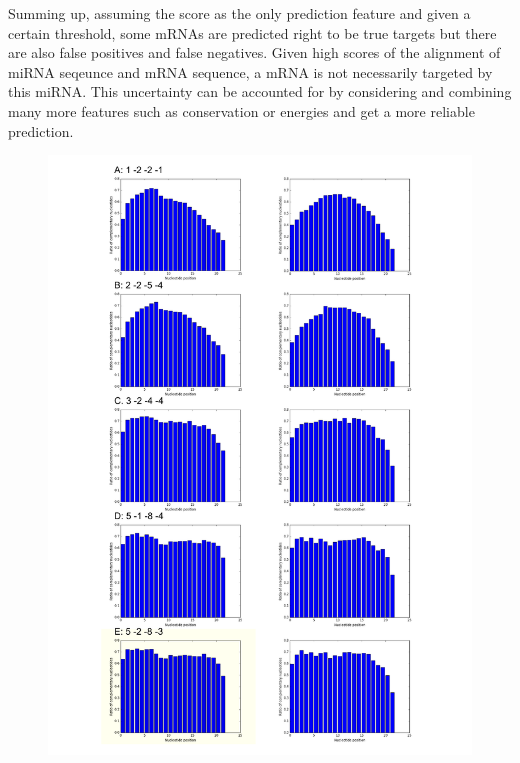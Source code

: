 \documentclass[12pt,  a4paper]{report}
\begin{document}
Summing up, assuming the score as the only prediction feature and given a certain threshold, some mRNAs are predicted right to be true targets but there are also false positives and false negatives. Given high scores of the alignment of miRNA seqeunce and mRNA sequence, a mRNA is not necessarily targeted by this miRNA. This uncertainty can be accounted for by considering and combining many more features such as conservation or energies and get a more reliable prediction.\\


\begin{figure}
\vspace{-1cm}
\hspace{-1cm}
\includegraphics[scale=0.75]{results/compl1.pdf}
\end{figure}
\end{document}
